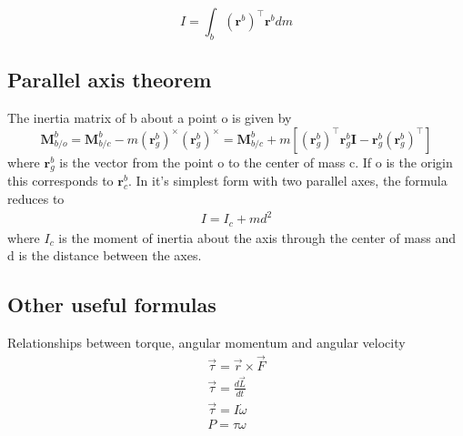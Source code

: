 \begin{equation}
    I = \int_{b} (\mathbf{r}^b)^\top \mathbf{r}^b dm
\end{equation}

\subsection{Parallel axis theorem}
The inertia matrix of b about a point o is given by 
\begin{equation}
    \mathbf{M}_{b/o}^b = \mathbf{M}_{b/c}^b - m (\mathbf{r}_g^b)^\times (\mathbf{r}_g^b)^\times =
    \mathbf{M}_{b/c}^b + m\left[ (\mathbf{r}_g^b)^\top \mathbf{r}_g^b \mathbf{I} - \mathbf{r}_g^b (\mathbf{r}_g^b)^\top \right]
\end{equation}
where $\mathbf{r}_g^b$ is the vector from the point o to the center of mass c. If o is the origin this corresponds to $\mathbf{r}_c^b$. In it's simplest form with two parallel axes, the formula reduces to 
\begin{align}
    I = I_c + md^2
\end{align}
where $I_c$ is the moment of inertia about the axis through the center of mass and d is the distance between the axes. 

\subsection{Other useful formulas}
Relationships between torque, angular momentum and angular velocity
\begin{align}
    \vec{\tau} = \vec{r} \times \vec{F}\\
    \vec{\tau} = \frac{d\vec{L}}{dt}\\
    \vec{\tau} = I \dot{\omega}\\
    P = \tau \omega
\end{align}








